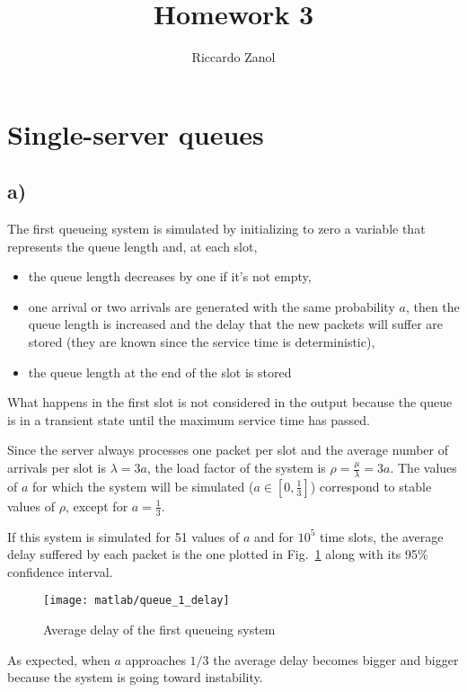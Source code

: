 \documentclass[a4paper,oneside]{article}
\author{Riccardo Zanol}
\title{Homework 3}
\begin{document}
\maketitle
\section{Single-server queues}
\subsection*{a)}
The first queueing system is simulated by initializing to zero a
variable that represents the queue length and, at each slot,
\begin{itemize}
\item the queue length decreases by one if it's not empty,
  \item one arrival or two arrivals are generated with the same
    probability $a$, then the queue length is increased and the delay
    that the new packets will suffer are stored (they are known since
    the service time is deterministic),
  \item the queue length at the end of the slot is stored
\end{itemize}
What happens in the first slot is not considered in the output because
the queue is in a transient state until the maximum service time has
passed.

Since the server always processes one packet per slot and the average
number of arrivals per slot is $\lambda = 3a$, the load factor of the
system is $\rho = \frac{\mu}{\lambda} = 3a$. The values of $a$ for
which the system will be simulated ($ a \in [0, \frac{1}{3}]$)
correspond to stable values of $\rho$, except for $a=\frac{1}{3}$.

If this system is simulated for 51 values of $a$ and for $10^5$ time
slots, the average delay suffered by each packet is the one plotted in
Fig.~\ref{plot:queue1_delay} along with its 95\% confidence
interval.
\begin{figure}[htbp]
  \centering
    \texttt{[image: matlab/queue\_1\_delay]}
    \caption{Average delay of the first queueing system}
    \label{plot:queue1_delay}
\end{figure}
As expected, when $a$ approaches $1/3$ the average delay becomes
bigger and bigger because the system is going toward instability.
\end{document}
